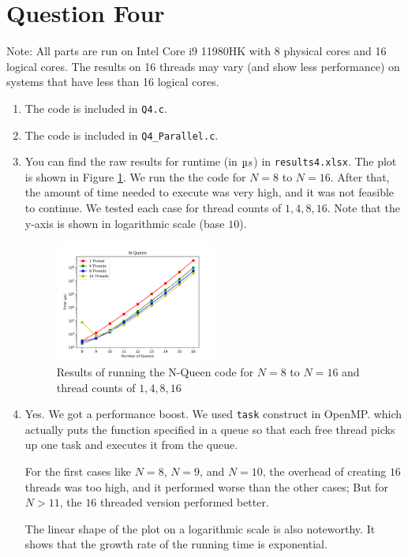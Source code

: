 \documentclass[12pt]{article}
\begin{document}
	\newpage
	
	\section{Question Four}
	
	Note: All parts are run on Intel Core i9 11980HK with 8 physical cores and 16 logical cores. The results on 16 threads may vary (and show less performance) on systems that have less than 16 logical cores.
	
	\begin{enumerate}[label=\alph*.]
		
		\item 
		The code is included in \Verb+Q4.c+.
		
		\item 
		The code is included in \Verb+Q4_Parallel.c+.
		
		\item 
		You can find the raw results for runtime (in $\micro s$) in \Verb+results4.xlsx+. The plot is shown in Figure \ref{fig:8}. We run the the code for $N=8$ to $N=16$. After that, the amount of time needed to execute was very high, and it was not feasible to continue. We tested each case for thread counts of $1,4,8,16$. Note that the y-axis is shown in logarithmic scale (base $10$).
		
		
		\begin{figure}[H]
			\centering
			\includegraphics[width=0.5\textwidth]{./images/Q4/N-Queen.png}	
			\cprotect\caption{Results of running the N-Queen code for $N=8$ to $N=16$ and thread counts of $1,4,8,16$}
			\label{fig:8}
		\end{figure}
		
		
		\item 
		Yes. We got a performance boost. We used \Verb+task+ construct in OpenMP. which actually puts the function specified in a queue so that each free thread picks up one task and executes it from the queue.
		
		For the first cases like $N=8$, $N=9$, and $N=10$, the overhead of creating $16$ threads was too high, and it performed worse than the other cases; But for $N>11$, the $16$ threaded version performed better. 
		
		The linear shape of the plot on a logarithmic scale is also noteworthy. It shows that the growth rate of the running time is exponential.
		
		
	\end{enumerate}
	
	\newpage
	
	
\end{document}
